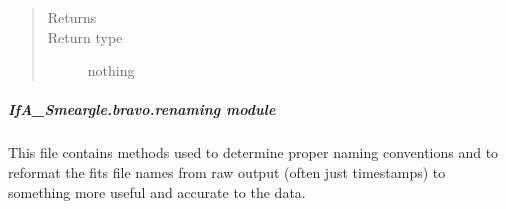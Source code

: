 \documentclass[letterpaper,10pt,english]{sphinxmanual}
\begin{document}
\begin{fulllineitems}
\begin{quote}
\begin{description}
\begin{itemize}
\begin{itemize}
\begin{description}
\end{description}

\end{itemize}


\end{itemize}

\item[{Returns}] \leavevmode


\item[{Return type}] \leavevmode
nothing

\end{description}\end{quote}

\end{fulllineitems}



\subparagraph{IfA\_Smeargle.bravo.renaming module}
\label{\detokenize{python_docstrings/IfA_Smeargle.bravo.renaming:module-IfA_Smeargle.bravo.renaming}}\label{\detokenize{python_docstrings/IfA_Smeargle.bravo.renaming:ifa-smeargle-bravo-renaming-module}}\label{\detokenize{python_docstrings/IfA_Smeargle.bravo.renaming::doc}}
This file contains methods used to determine proper naming conventions and
to reformat the fits file names from raw output  (often just timestamps) to
something more useful and accurate to the data.

\begin{fulllineitems}
\label{\detokenize{python_docstrings/IfA_Smeargle.bravo.renaming:IfA_Smeargle.bravo.renaming.filename_split_by_parameter}}
\end{fulllineitems}

\end{document}
